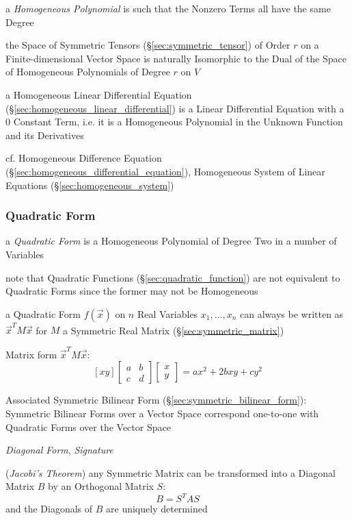 a \emph{Homogeneous Polynomial} is such that the Nonzero Terms all have the same
Degree

the Space of Symmetric Tensors (\S\ref{sec:symmetric_tensor}) of Order $r$ on a
Finite-dimensional Vector Space is naturally Isomorphic to the Dual of the
Space of Homogeneous Polynomials of Degree $r$ on $V$

a Homogeneous Linear Differential Equation
(\S\ref{sec:homogeneous_linear_differential}) is a Linear Differential
Equation with a $0$ Constant Term, i.e. it is a Homogeneous Polynomial in the
Unknown Function and its Derivatives

cf. Homogeneous Difference Equation
(\S\ref{sec:homogeneous_differential_equation}),
Homogeneous System of Linear Equations (\S\ref{sec:homogeneous_system})



\subsubsection{Quadratic Form}\label{sec:quadratic_form}

a \emph{Quadratic Form} is a Homogeneous Polynomial of Degree Two in a number of
Variables

note that Quadratic Functions (\S\ref{sec:quadratic_function}) are not
equivalent to Quadratic Forms since the former may not be Homogeneous

a Quadratic Form $f(\vec{x})$ on $n$ Real Variables $x_1,\ldots,x_n$ can always
be written as $\vec{x}^T M \vec{x}$ for $M$ a Symmetric Real Matrix
(\S\ref{sec:symmetric_matrix})

Matrix form $\vec{x}^T M \vec{x}$:
\[
  [x y]
  \begin{bmatrix}
    a & b \\
    c & d
  \end{bmatrix}
  \begin{bmatrix}
    x \\
    y
  \end{bmatrix}
  = ax^2 + 2bxy + cy^2
\]

Associated Symmetric Bilinear Form (\S\ref{sec:symmetric_bilinear_form}):
Symmetric Bilinear Forms over a Vector Space correspond one-to-one with
Quadratic Forms over the Vector Space

\emph{Diagonal Form}, \emph{Signature}

(\emph{Jacobi's Theorem}) any Symmetric Matrix can be transformed into a
Diagonal Matrix $B$ by an Orthogonal Matrix $S$:
\[
  B = S^T A S
\]
and the Diagonals of $B$ are uniquely determined

